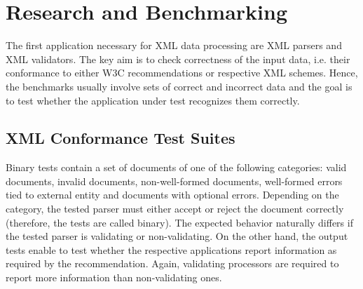\section{Research and Benchmarking}
The first application necessary for XML data processing are XML parsers and XML validators. The key aim is to check correctness of the input data, i.e. their conformance to either W3C recommendations or respective XML schemes. Hence, the benchmarks usually involve sets of correct and incorrect data and the goal is to test whether the application under test recognizes them correctly.
\subsection{XML Conformance Test Suites}
Binary tests contain a set of documents of one of the following categories: valid documents, invalid documents, non-well-formed documents, well-formed errors tied to external entity and documents with optional errors. Depending on the category, the tested parser must either accept or reject the document correctly (therefore, the tests are called binary). The expected behavior naturally differs if the tested parser is validating or non-validating. On the other hand, the output tests enable to test whether the respective applications report information as required by the recommendation. Again, validating processors are required to report more information than non-validating ones.
\subsection{}

\subsection{}
